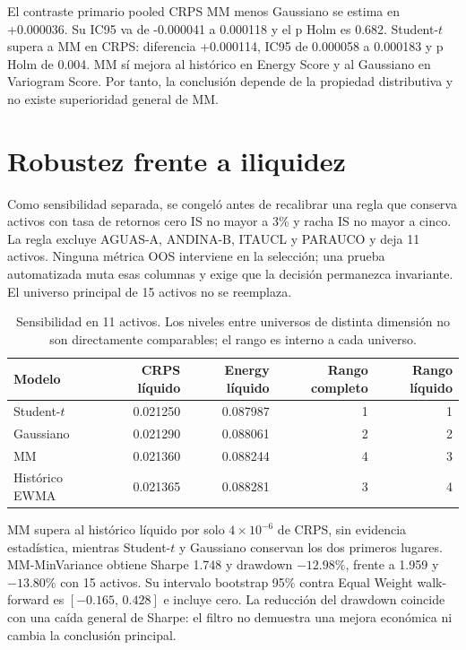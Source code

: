 \documentclass[11pt,letterpaper]{article}
\begin{document}
El contraste primario pooled CRPS MM menos Gaussiano se estima en +0.000036.
Su IC95 va de -0.000041 a 0.000118 y el p Holm es 0.682. Student-$t$ supera a MM
en CRPS: diferencia +0.000114, IC95 de 0.000058 a 0.000183 y p Holm de 0.004.
MM sí mejora al histórico en Energy Score y al Gaussiano en Variogram Score. Por
tanto, la conclusión depende de la propiedad distributiva y no existe superioridad
general de MM.

\section{Robustez frente a iliquidez}

Como sensibilidad separada, se congeló antes de recalibrar una regla que conserva
activos con tasa de retornos cero IS no mayor a 3\% y racha IS no mayor a cinco.
La regla excluye AGUAS-A, ANDINA-B, ITAUCL y PARAUCO y deja 11 activos. Ninguna
métrica OOS interviene en la selección; una prueba automatizada muta esas columnas y
exige que la decisión permanezca invariante. El universo principal de 15 activos no
se reemplaza.

\begin{table}[ht]
\centering
\small
\begin{tabular}{lrrrr}
\toprule
Modelo & CRPS líquido & Energy líquido & Rango completo & Rango líquido \\
\midrule
Student-$t$ & 0.021250 & 0.087987 & 1 & 1 \\
Gaussiano & 0.021290 & 0.088061 & 2 & 2 \\
MM & 0.021360 & 0.088244 & 4 & 3 \\
Histórico EWMA & 0.021365 & 0.088281 & 3 & 4 \\
\bottomrule
\end{tabular}
\caption{Sensibilidad en 11 activos. Los niveles entre universos de distinta
dimensión no son directamente comparables; el rango es interno a cada universo.}
\end{table}

MM supera al histórico líquido por solo $4\times10^{-6}$ de CRPS, sin evidencia
estadística, mientras Student-$t$ y Gaussiano conservan los dos primeros lugares.
MM-MinVariance obtiene Sharpe 1.748
y drawdown $-12.98\%$, frente a 1.959 y $-13.80\%$ con 15 activos. Su intervalo
bootstrap 95\% contra Equal Weight walk-forward es $[-0.165,\,0.428]$ e incluye cero.
La reducción del drawdown coincide con una caída general de Sharpe: el filtro no
demuestra una mejora económica ni cambia la conclusión principal.
\end{document}

